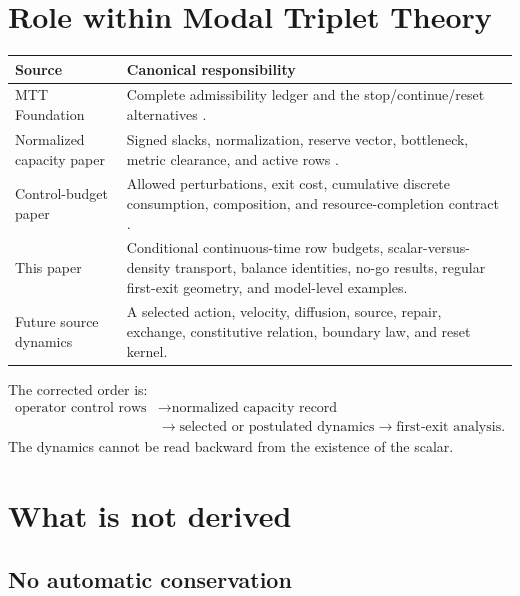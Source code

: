\documentclass[11pt]{article}
\theoremstyle{definition}
\theoremstyle{remark}
\begin{document}
\section{Role within Modal Triplet Theory}
\label{sec:mtt}

\begin{center}
\begin{tabularx}{\textwidth}{@{}L{0.28\textwidth}Y@{}}
\toprule
Source & Canonical responsibility \\
\midrule
MTT Foundation
& Complete admissibility ledger and the stop/continue/reset alternatives
  \cite{MTTFoundation2026}.\\

Normalized capacity paper
& Signed slacks, normalization, reserve vector, bottleneck, metric
  clearance, and active rows \cite{CapacityMargin2026}.\\

Control-budget paper
& Allowed perturbations, exit cost, cumulative discrete consumption,
  composition, and resource-completion contract
  \cite{CapacityBudget2026}.\\

This paper
& Conditional continuous-time row budgets, scalar-versus-density
  transport, balance identities, no-go results, regular first-exit
  geometry, and model-level examples.\\

Future source dynamics
& A selected action, velocity, diffusion, source, repair, exchange,
  constitutive relation, boundary law, and reset kernel.\\
\bottomrule
\end{tabularx}
\end{center}

The corrected order is:
\[
 \begin{aligned}
 \text{operator control rows}
 &\longrightarrow
 \text{normalized capacity record}\\
 &\longrightarrow
 \text{selected or postulated dynamics}
 \longrightarrow
 \text{first-exit analysis}.
 \end{aligned}
\]
The dynamics cannot be read backward from the existence of the scalar.

\section{What is not derived}
\label{sec:limits}

\subsection{No automatic conservation}
\end{document}
